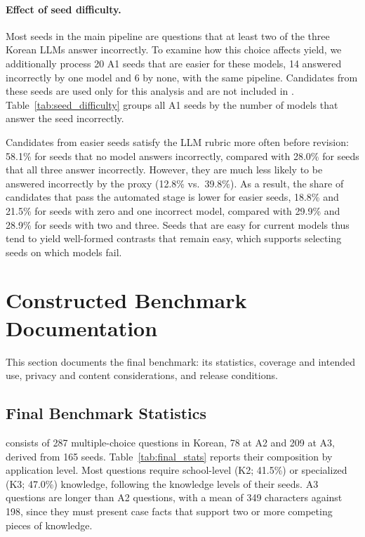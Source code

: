 \paragraph{Effect of seed difficulty.}
\label{app:easy}
Most seeds in the main pipeline are questions that at least two of the three Korean LLMs answer incorrectly.
To examine how this choice affects yield, we additionally process 20 A1 seeds that are easier for these models, 14 answered incorrectly by one model and 6 by none, with the same pipeline.
Candidates from these seeds are used only for this analysis and are not included in \name{}.
Table~\ref{tab:seed_difficulty} groups all A1 seeds by the number of models that answer the seed incorrectly.



Candidates from easier seeds satisfy the LLM rubric more often before revision: 58.1\% for seeds that no model answers incorrectly, compared with 28.0\% for seeds that all three answer incorrectly.
However, they are much less likely to be answered incorrectly by the proxy (12.8\% vs.\ 39.8\%).
As a result, the share of candidates that pass the automated stage is lower for easier seeds, 18.8\% and 21.5\% for seeds with zero and one incorrect model, compared with 29.9\% and 28.9\% for seeds with two and three.
Seeds that are easy for current models thus tend to yield well-formed contrasts that remain easy, which supports selecting seeds on which models fail.

\section{Constructed Benchmark Documentation}
\label{app:benchmark_documentation}

This section documents the final benchmark: its statistics, coverage and intended use, privacy and content considerations, and release conditions.

\subsection{Final Benchmark Statistics}

\name{} consists of 287 multiple-choice questions in Korean, 78 at A2 and 209 at A3, derived from 165 seeds.
Table~\ref{tab:final_stats} reports their composition by application level.
Most questions require school-level (K2; 41.5\%) or specialized (K3; 47.0\%) knowledge, following the knowledge levels of their seeds.
A3 questions are longer than A2 questions, with a mean of 349 characters against 198, since they must present case facts that support two or more competing pieces of knowledge.

